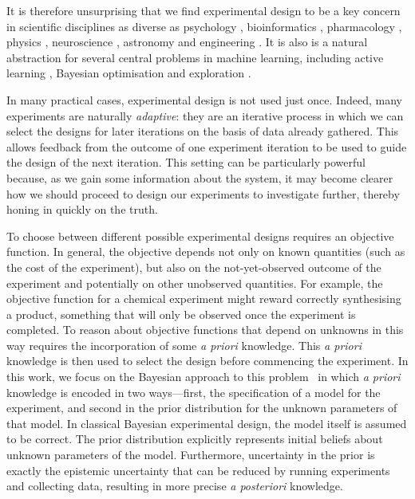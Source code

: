 \documentclass[a4paper, 10pt]{report}
\theoremstyle{plain}
\begin{document}
	It is therefore unsurprising that we find experimental design to be a key concern in scientific disciplines as diverse as psychology \citep{myung2013}, bioinformatics \citep{vanlier2012}, pharmacology \citep{lyu2019ultra}, physics \citep{dushenko2020sequential}, neuroscience \citep{shababo2013bayesian}, astronomy \citep{loredo2004bayesian} and engineering \citep{papadimitriou2004optimal}.
	It is also is a natural abstraction for several central problems in machine learning, including active learning \citep{houlsby2011bayesian,gal2017deep}, Bayesian optimisation \citep{hernandez2014,shahriari2015taking} and exploration \citep{sun2011planning,shyam2019model}.
	
	
	In many practical cases, experimental design is not used just once.
	Indeed, many experiments are naturally \emph{adaptive}: they are an iterative process in which we can select the designs for later iterations on the basis of data already gathered. 
	This allows feedback from the outcome of one experiment iteration to be used to guide the design of the next iteration.
	This setting can be particularly powerful because, as we gain some information about the system, it may become clearer how we should proceed to design our experiments to investigate further, thereby honing in quickly on the truth.
	
	To choose between different possible experimental designs requires an objective function.
	In general, the objective depends not only on known quantities (such as the cost of the experiment), but also on the not-yet-observed outcome of the experiment and potentially on other unobserved quantities. %
	For example, the objective function for a chemical experiment might reward correctly synthesising a product, something that will only be observed once the experiment is completed.
	To reason about objective functions that depend on unknowns in this way requires the incorporation of some \emph{a priori} knowledge. This \emph{a priori} knowledge is then used to select the design before commencing the experiment.
	In this work, we focus on the Bayesian approach to this problem~\citep{lindley1956,lindley1972,chaloner1995,ryan2016review,foster2019variational} in which \emph{a priori} knowledge is encoded in two ways---first, the specification of a model for the experiment, and second in the prior distribution for the unknown parameters of that model.
	In classical Bayesian experimental design, the model itself is assumed to be correct.
	The prior distribution explicitly represents initial beliefs about unknown parameters of the model.
	Furthermore, uncertainty in the prior is exactly the epistemic uncertainty that can be reduced by running experiments and collecting data, resulting in more precise \emph{a posteriori} knowledge.
	
\end{document}
